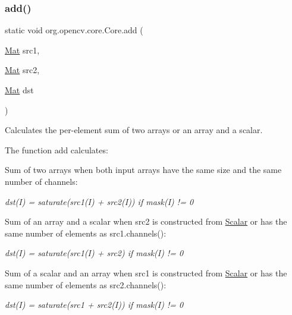\subsubsection{\texorpdfstring{add()}{add()}\hspace{0.1cm}{\footnotesize\ttfamily [3/6]}}
{\footnotesize\ttfamily static void org.\+opencv.\+core.\+Core.\+add (\begin{DoxyParamCaption}\item[{\mbox{\hyperlink{classorg_1_1opencv_1_1core_1_1_mat}{Mat}}}]{src1,  }\item[{\mbox{\hyperlink{classorg_1_1opencv_1_1core_1_1_mat}{Mat}}}]{src2,  }\item[{\mbox{\hyperlink{classorg_1_1opencv_1_1core_1_1_mat}{Mat}}}]{dst }\end{DoxyParamCaption})\hspace{0.3cm}{\ttfamily [static]}}

Calculates the per-\/element sum of two arrays or an array and a scalar.

The function {\ttfamily add} calculates\+:


\begin{DoxyItemize}
\item Sum of two arrays when both input arrays have the same size and the same number of channels\+: 
\end{DoxyItemize}

{\itshape dst(\+I) = saturate(src1(\+I) + src2(\+I)) if mask(\+I) != 0}


\begin{DoxyItemize}
\item Sum of an array and a scalar when {\ttfamily src2} is constructed from {\ttfamily \mbox{\hyperlink{classorg_1_1opencv_1_1core_1_1_scalar}{Scalar}}} or has the same number of elements as {\ttfamily src1.\+channels()}\+: 
\end{DoxyItemize}

{\itshape dst(\+I) = saturate(src1(\+I) + src2) if mask(\+I) != 0}


\begin{DoxyItemize}
\item Sum of a scalar and an array when {\ttfamily src1} is constructed from {\ttfamily \mbox{\hyperlink{classorg_1_1opencv_1_1core_1_1_scalar}{Scalar}}} or has the same number of elements as {\ttfamily src2.\+channels()}\+: 
\end{DoxyItemize}

{\itshape dst(\+I) = saturate(src1 + src2(\+I)) if mask(\+I) != 0}

